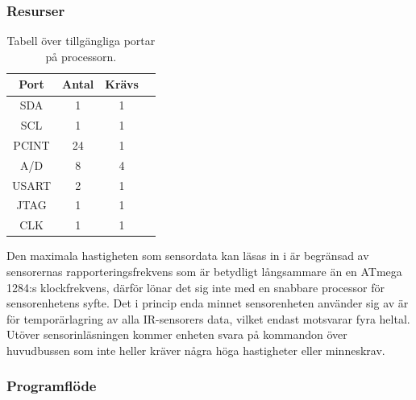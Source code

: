 \documentclass{article}
\begin{document}
\subsubsection{Resurser}
\begin{table}[H]
  \centering
  \begin{tabular}{ | c | c | c | c |}
    \hline
    \textbf{Port} & \textbf{Antal} & \textbf{Krävs} \\
    \hline
    SDA & 1 & 1 \\
    \hline
    SCL & 1 & 1 \\
    \hline
    PCINT & 24 & 1 \\
    \hline
    A/D & 8 & 4 \\
    \hline
    USART & 2 & 1 \\
    \hline
    JTAG & 1 & 1 \\
    \hline
    CLK & 1 & 1 \\
    \hline
  \end{tabular}
  \caption{Tabell över tillgängliga portar på processorn.}
\end{table}

Den maximala hastigheten som sensordata kan läsas in i är begränsad av sensorernas rapporteringsfrekvens som är betydligt långsammare än en ATmega 1284:s klockfrekvens, därför lönar det sig inte med en snabbare processor för sensorenhetens syfte. Det i princip enda minnet sensorenheten använder sig av är för temporärlagring av alla IR-sensorers data, vilket endast motsvarar fyra heltal. Utöver sensorinläsningen kommer enheten svara på kommandon över huvudbussen som inte heller kräver några höga hastigheter eller minneskrav.

\subsubsection{Programflöde}
\end{document}
